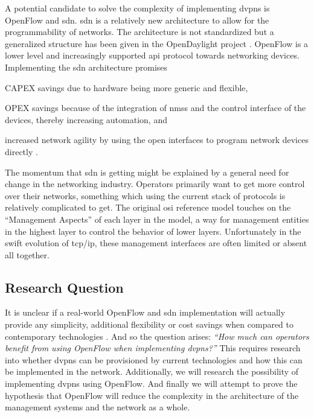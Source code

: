 A potential candidate to solve the complexity of implementing \acp{dvpn} is OpenFlow \cite{openflow} and \ac{sdn}. \ac{sdn} is a relatively new architecture to allow for the programmability of networks. The architecture is not standardized but a generalized structure has been given in the OpenDaylight project \cite{opendaylight}. OpenFlow is a lower level and increasingly supported \ac{api} protocol towards networking devices. Implementing the \ac{sdn} architecture promises
\begin{inparaenum}
	\item CAPEX savings due to hardware being more generic and flexible,
	\item OPEX savings because of the integration of \acp{nms} and the control interface of the devices, thereby increasing automation, and
	\item increased network agility by using the open interfaces to program network devices directly \cite{packet-circuit}.
	\end{inparaenum} 

	
The momentum that \ac{sdn} is getting might be explained by a general need for change in the networking industry. Operators primarily want to get more control over their networks, something which using the current stack of protocols is relatively complicated to get. The original \acs{osi} reference model \cite{zimmermann} touches on the ``Management Aspects'' of each layer in the model, a way for management entities in the highest layer to control the behavior of lower layers. Unfortunately in the swift evolution of \ac{tcp}/\ac{ip}, these management interfaces are often limited or absent all together. 



	\subsection{Research Question} %
	\label{sub:research_question}
	It is unclear if a real-world OpenFlow and \ac{sdn} implementation will actually provide any simplicity, additional flexibility or cost savings when compared to contemporary technologies \cite{programmability-answer}. And so the question arises: \textsl{``How much can operators benefit from using OpenFlow when implementing \aclp{dvpn}?''} 
	This requires research into whether \acp{dvpn} can be provisioned by current technologies and how this can be implemented in the network. Additionally, we will research the possibility of implementing \acp{dvpn} using OpenFlow. And finally we will attempt to prove the hypothesis that OpenFlow will reduce the complexity in the architecture of the management systems and the network as a whole.

